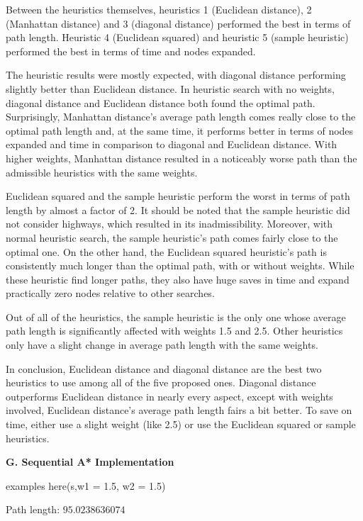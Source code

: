 \documentclass[12pt, letterpaper]{article}
\begin{document}
Between the heuristics themselves, heuristics 1 (Euclidean distance), 2 (Manhattan distance) and 3 (diagonal distance) performed the best in terms of path length. Heuristic 4 (Euclidean squared) and heuristic 5 (sample heuristic) performed the best in terms of time and nodes expanded.

The heuristic results were mostly expected, with diagonal distance performing slightly better than Euclidean distance. In heuristic search with no weights, diagonal distance and Euclidean distance both found the optimal path. Surprisingly, Manhattan distance's average path length comes really close to the optimal path length and, at the same time, it performs better in terms of nodes expanded and time in comparison to diagonal and Euclidean distance. With higher weights, Manhattan distance resulted in a noticeably worse path than the admissible heuristics with the same weights. 

Euclidean squared and the sample heuristic perform the worst in terms of path length by almost a factor of 2. It should be noted that the sample heuristic did not consider highways, which resulted in its inadmissibility. Moreover, with normal heuristic search, the sample heuristic's path comes fairly close to the optimal one. On the other hand, the Euclidean squared heuristic's path is consistently much longer than the optimal path, with or without weights. While these heuristic find longer paths, they also have huge saves in time and expand practically zero nodes relative to other searches.

Out of all of the heuristics, the sample heuristic is the only one whose average path length is significantly affected with weights 1.5 and 2.5. Other heuristics only have a slight change in average path length with the same weights.


In conclusion, Euclidean distance and diagonal distance are the best two heuristics to use among all of the five proposed ones. Diagonal distance outperforms Euclidean distance in nearly every aspect, except with weights involved, Euclidean distance's average path length fairs a bit better. To save on time, either use a slight weight (like 2.5) or use the Euclidean squared or sample heuristics. 

\pagebreak %

\noindent \textbf{G. Sequential A* Implementation}

examples here(s,w1 = 1.5, w2 = 1.5)

Path length: $ 95.0238636074 $
\end{document}
